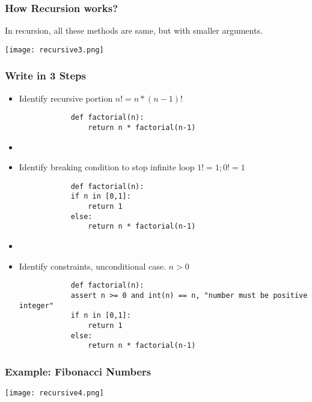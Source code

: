 \begin{frame}[fragile]
	\frametitle{How Recursion works?}

In recursion, all these methods are same, but with smaller arguments.
		
		
\begin{center}
\texttt{[image: recursive3.png]}
\end{center}


\end{frame}


\begin{frame}[fragile]
	\frametitle{Write in 3 Steps}
		\begin{itemize}
			\item Identify recursive portion
			$n! = n * (n-1)!$
			
			\begin{lstlisting}
			def factorial(n):
				return n * factorial(n-1)
			\end{lstlisting}
			
			\item 

			\item Identify breaking condition to stop infinite loop
			$1! = 1; 0! = 1$
			
			\begin{lstlisting}
			def factorial(n):
			if n in [0,1]:
				return 1
			else:
				return n * factorial(n-1)
			\end{lstlisting}	
			
			\item 

			\item Identify constraints, unconditional case.
			$n > 0$
			
			\begin{lstlisting}
			def factorial(n):
			assert n >= 0 and int(n) == n, "number must be positive integer"
			if n in [0,1]:
				return 1
			else:
				return n * factorial(n-1)
			\end{lstlisting}
			
		\end{itemize}
\end{frame}

\begin{frame}[fragile]
	\frametitle{Example: Fibonacci Numbers}


\begin{center}
\texttt{[image: recursive4.png]}
\end{center}


\end{frame}

